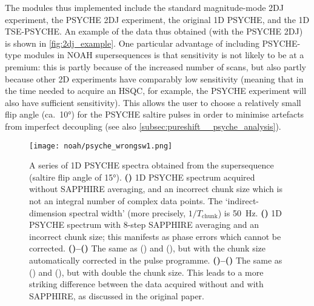 The modules thus implemented include the standard magnitude-mode 2DJ experiment, the PSYCHE 2DJ experiment\autocite{Foroozandeh2015CC}, the original 1D PSYCHE\autocite{Foroozandeh2014ACIE}, and the 1D TSE-PSYCHE\autocite{Foroozandeh2015CC}.
An example of the data thus obtained (with the PSYCHE 2DJ) is shown in \cref{fig:2dj_example}.
One particular advantage of including PSYCHE-type modules in NOAH supersequences is that sensitivity is not likely to be at a premium: this is partly because of the increased number of scans, but also partly because other 2D experiments have comparably low sensitivity (meaning that in the time needed to acquire an HSQC, for example, the PSYCHE experiment will also have sufficient sensitivity).
This allows the user to choose a relatively small flip angle (ca.\ \ang{10}) for the PSYCHE saltire pulses in order to minimise artefacts from imperfect decoupling (see also \cref{subsec:pureshift__psyche_analysis}).

\begin{figure}[!ht]
    \centering
    \texttt{[image: noah/psyche\_wrongsw1.png]}%
    {\label{fig:psyche_wrongsw1_bad_nosap}}%
    {\label{fig:psyche_wrongsw1_bad_sap}}%
    {\label{fig:psyche_wrongsw1_good_nosap}}%
    {\label{fig:psyche_wrongsw1_good_sap}}%
    {\label{fig:psyche_wrongsw1_good_nosap_25}}%
    {\label{fig:psyche_wrongsw1_good_sap_25}}%
    \caption[Effect of automatic chunk size calculation and SAPPHIRE averaging on NOAH PSYCHE spectra]{
        A series of 1D PSYCHE spectra obtained from the  supersequence (saltire flip angle of \ang{15}).
        \textbf{()} 1D PSYCHE spectrum acquired without SAPPHIRE averaging, and an incorrect chunk size which is not an integral number of complex data points. The `indirect-dimension spectral width' (more precisely, $1/T_\text{chunk}$) is \qty{50}{\Hz}.
        \textbf{()} 1D PSYCHE spectrum with  8-step SAPPHIRE averaging and an incorrect chunk size; this manifests as phase errors which cannot be corrected.
        \textbf{()--()} The same as () and (), but with the chunk size automatically corrected in the pulse programme.
        \textbf{()--()} The same as () and (), but with double the chunk size.
        This leads to a more striking difference between the data acquired without and with SAPPHIRE, as discussed in the original paper\autocite{Moutzouri2017CC}.
    }
    \label{fig:psyche_wrongsw1}
\end{figure}

